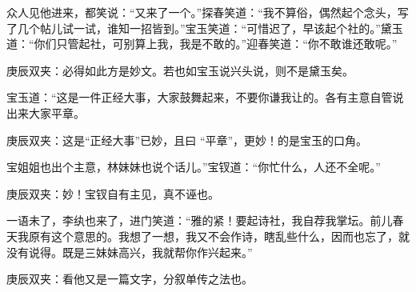 \begin{parag}
    众人见他进来，都笑说：“又来了一个。”探春笑道：“我不算俗，偶然起个念头，写了几个帖儿试一试，谁知一招皆到。”宝玉笑道：“可惜迟了，早该起个社的。”黛玉道：“你们只管起社，可别算上我，我是不敢的。”迎春笑道：“你不敢谁还敢呢。”\begin{note}庚辰双夹：必得如此方是妙文。若也如宝玉说兴头说，则不是黛玉矣。\end{note}宝玉道：“这是一件正经大事，大家鼓舞起来，不要你谦我让的。各有主意自管说出来大家平章。\begin{note}庚辰双夹：这是“正经大事”已妙，且曰 “平章”，更妙！的是宝玉的口角。\end{note}宝姐姐也出个主意，林妹妹也说个话儿。”宝钗道：“你忙什么，人还不全呢。”\begin{note}庚辰双夹：妙！宝钗自有主见，真不诬也。\end{note}一语未了，李纨也来了，进门笑道：“雅的紧！要起诗社，我自荐我掌坛。前儿春天我原有这个意思的。我想了一想，我又不会作诗，瞎乱些什么，因而也忘了，就没有说得。既是三妹妹高兴，我就帮你作兴起来。”\begin{note}庚辰双夹：看他又是一篇文字，分叙单传之法也。\end{note}
\end{parag}


